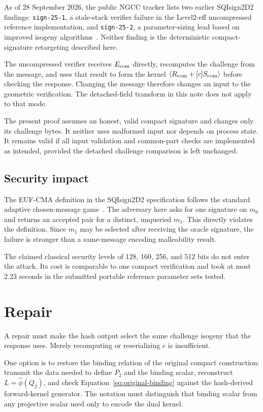\documentclass[11pt,a4paper]{article}
\begin{document}
As of 28 September 2026, the public NGCC tracker lists two earlier SQIsign2D2 findings:
\texttt{sign-25-1}, a stale-stack verifier failure in the Level2-eff uncompressed reference
implementation, and \texttt{sign-25-2}, a parameter-sizing lead based on improved isogeny
algorithms~\cite{ngcc-tracker}.  Neither finding is the deterministic compact-signature
retargeting described here.

The uncompressed verifier receives $E_{\rm com}$ directly, recomputes the challenge from the
message, and uses that result to form the kernel
$\langle R_{\rm com}+[c]S_{\rm com}\rangle$ before checking the response.  Changing the
message therefore changes an input to the geometric verification.  The detached-field transform
in this note does not apply to that mode.

The present proof assumes an honest, valid compact signature and changes only its challenge
bytes.  It neither uses malformed input nor depends on process state.  It remains valid if all
input validation and common-part checks are implemented as intended, provided the detached
challenge comparison is left unchanged.

\subsection{Security impact}

The EUF-CMA definition in the SQIsign2D2 specification follows the standard adaptive
chosen-message game~\cite{gmr}.  The adversary here asks for one signature on $m_0$ and returns
an accepted pair for a distinct, unqueried $m_1$.  This directly violates the definition.  Since
$m_1$ may be selected after receiving the oracle signature, the failure is stronger than a
same-message encoding malleability result.

The claimed classical security levels of 128, 160, 256, and 512 bits do not enter the attack.
Its cost is comparable to one compact verification and took at most 2.23 seconds in the
submitted portable reference parameter sets tested.

\section{Repair}
\label{sec:repair}

A repair must make the hash output select the same challenge isogeny that the response uses.
Merely recomputing or reserializing $c$ is insufficient.

One option is to restore the binding relation of the original compact construction: transmit the
data needed to define $P_2$ and the binding scalar, reconstruct $L=\widehat\phi(Q_2)$, and check
Equation~\eqref{eq:original-binding} against the hash-derived forward-kernel generator.  The
notation must distinguish that binding scalar from any projective scalar used only to encode the
dual kernel.
\end{document}
